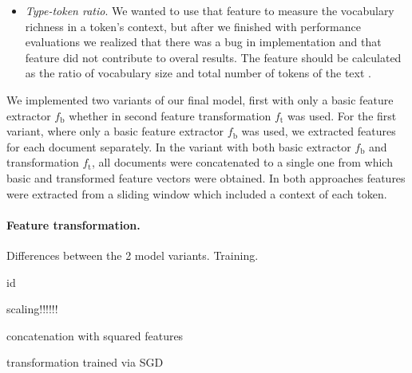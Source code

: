 \documentclass[10pt, a4paper]{article}
\begin{document}
\begin{itemize}
	\item \textit{Type-token ratio}. We wanted to use that feature to measure the vocabulary richness in a token's context, but after we finished with performance evaluations we realized that there was a bug in implementation and that feature did not contribute to overal results. The feature should be calculated as the ratio of vocabulary size and total number of tokens of the text \citep{stamatatos-2009a}.
\end{itemize}

We implemented two variants of our final model, first with only a basic feature extractor $f_\mathrm{b}$ whether in second feature transformation $f_\mathrm{t}$ was used. For the first variant, where only a basic feature extractor $f_\mathrm{b}$ was used, we extracted features for each document separately. In the variant with both basic extractor $f_\mathrm{b}$ and transformation $f_\mathrm{t}$, all documents were concatenated to a single one from which basic and transformed feature vectors were obtained. In both approaches features were extracted from a sliding window which included a context of each token.

\paragraph{Feature transformation.} Differences between the 2 model variants. Training.

id

scaling!!!!!!

concatenation with squared features

transformation trained via SGD
\end{document}
